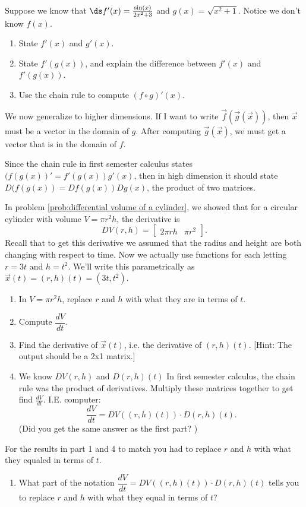 \begin{problem}\label{prob:chain rule review}
 Suppose we know that $\ds f'(x) = \frac{\sin(x)}{2x^2+3}$ and $g(x)=\sqrt{x^2+1}$. Notice we don't know $f(x)$. 
\begin{enumerate}
 \item State $f'(x)$ and $g'(x)$.
 \item State $f'(g(x))$, and explain the difference between $f'(x)$ and $f'(g(x))$. 
 \item Use the chain rule to compute $(f\circ g)'(x)$. 
\end{enumerate}
\end{problem}

We now generalize to higher dimensions. If I want to write $\vec f(\vec g(\vec x))$, then $\vec x$ must be a vector in the domain of $g$.  After computing $\vec g(\vec x)$, we must get a vector that is in the domain of $f$.  

Since the chain rule in first semester calculus states $(f(g(x))'=f'(g(x))g'(x)$, then in high dimension it should state $D(f(g(x)) = Df(g(x))Dg(x)$, the product of two matrices. 

\begin{problem}\label{chain rule two}
 In problem \ref{prob:differential volume of a cylinder}, we showed that for a circular cylinder with volume $V=\pi r^2 h$, the derivative is 
$$DV(r,h)=\begin{bmatrix}
2\pi rh & \pi r^2
\end{bmatrix}.$$  
Recall that to get this derivative we assumed that the radius and height are both changing with respect to time. Now we actually use functions for each letting $r=3t$ and $h=t^2$. We'll write this parametrically as $\vec x (t) = (r,h)(t) = (3t, t^2)$.  
\begin{enumerate}
	\item In $V=\pi r^2 h$, replace $r$ and $h$ with what they are in terms of $t$. 
	\item Compute $\dfrac{dV}{dt}$. 
	\item Find the derivative of $\vec x (t) $, i.e. the derivative of $(r,h)(t)$. [Hint: The output should be a 2x1 matrix.] 
	\item We know 
$DV(r,h)$ and
$D(r,h)(t)$
In first semester calculus, the chain rule was the product of derivatives. Multiply these matrices together to get find $\frac{dV}{dt}$. I.E. computer: $$\dfrac{dV}{dt}=DV((r,h)(t))\cdot D(r,h)(t).$$ (Did you get the same answer as the first part? )
\end{enumerate}
For the results in part 1 and 4 to match you had to replace $r$ and $h$ with what they equaled in terms of $t$. 
\begin{enumerate}[resume]
	\item What part of the notation $\dfrac{dV}{dt}=DV((r,h)(t))\cdot D(r,h)(t)$ tells you to replace $r$ and $h$ with what they equal in terms of $t$?
\end{enumerate}
\end{problem}


